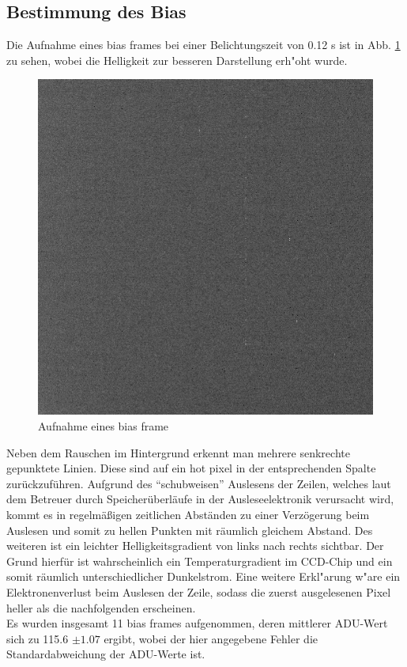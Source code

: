 \subsection{Bestimmung des Bias}
Die Aufnahme eines bias frames bei einer Belichtungszeit von 0.12 s ist in Abb. \ref{fig:bias} zu sehen, wobei die Helligkeit zur besseren Darstellung erh"oht wurde. 
\begin{figure}[h!]
\centering
        \includegraphics[width=.5\textwidth]{beiers_01.png}
\caption{ Aufnahme eines bias frame }
\label{fig:bias}
\end{figure}
Neben dem Rauschen im Hintergrund erkennt man mehrere senkrechte gepunktete Linien. Diese sind auf ein hot pixel in der entsprechenden Spalte zurückzuführen. Aufgrund des \enquote{schubweisen} Auslesens der Zeilen, welches laut dem Betreuer durch Speicherüberläufe in der Ausleseelektronik verursacht wird, kommt es in regelmäßigen zeitlichen Abständen zu einer Verzögerung beim Auslesen und somit zu hellen Punkten mit räumlich gleichem Abstand. Des weiteren ist ein leichter Helligkeitsgradient von links nach rechts sichtbar. Der Grund hierfür ist wahrscheinlich ein Temperaturgradient im CCD-Chip und ein somit räumlich unterschiedlicher Dunkelstrom. Eine weitere Erkl"arung w"are ein Elektronenverlust beim Auslesen der Zeile, sodass die zuerst ausgelesenen Pixel heller als die nachfolgenden erscheinen.\\
Es wurden insgesamt 11 bias frames aufgenommen, deren mittlerer ADU-Wert sich zu 115.6 $ \pm 1.07$ ergibt, wobei der hier angegebene Fehler die Standardabweichung der ADU-Werte ist. \\\

